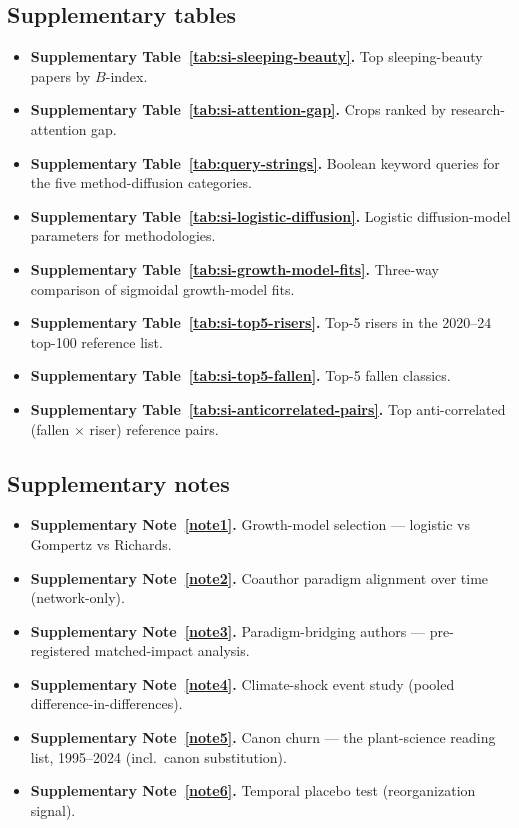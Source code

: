 \subsection*{Supplementary tables}
\begin{itemize}\setlength{\itemsep}{2pt}

\item \textbf{Supplementary Table~\ref{tab:si-sleeping-beauty}.} Top sleeping-beauty papers
        by $B$-index.
\item \textbf{Supplementary Table~\ref{tab:si-attention-gap}.} Crops ranked by
        research-attention gap.
\item \textbf{Supplementary Table~\ref{tab:query-strings}.} Boolean
        keyword queries for the five method-diffusion categories.

\item \textbf{Supplementary Table~\ref{tab:si-logistic-diffusion}.} Logistic diffusion-model
        parameters for methodologies.
\item \textbf{Supplementary Table~\ref{tab:si-growth-model-fits}.} Three-way comparison of
        sigmoidal growth-model fits.
\item \textbf{Supplementary Table~\ref{tab:si-top5-risers}.} Top-5 risers in the
        2020--24 top-100 reference list.
\item \textbf{Supplementary Table~\ref{tab:si-top5-fallen}.} Top-5 fallen
        classics.
\item \textbf{Supplementary Table~\ref{tab:si-anticorrelated-pairs}.} Top
        anti-correlated (fallen $\times$ riser) reference pairs.
\end{itemize}

\subsection*{Supplementary notes}
\begin{itemize}\setlength{\itemsep}{2pt}

\item \textbf{Supplementary Note~\ref{note1}.} Growth-model
        selection --- logistic vs Gompertz vs Richards.
\item \textbf{Supplementary Note~\ref{note2}.} Coauthor
        paradigm alignment over time (network-only).
\item \textbf{Supplementary Note~\ref{note3}.}
        Paradigm-bridging authors --- pre-registered matched-impact analysis.
\item \textbf{Supplementary Note~\ref{note4}.} Climate-shock
        event study (pooled difference-in-differences).
\item \textbf{Supplementary Note~\ref{note5}.} Canon churn ---
        the plant-science reading list, 1995--2024 (incl.\ canon substitution).

\item \textbf{Supplementary Note~\ref{note6}.} Temporal
        placebo test (reorganization signal).
\end{itemize}

